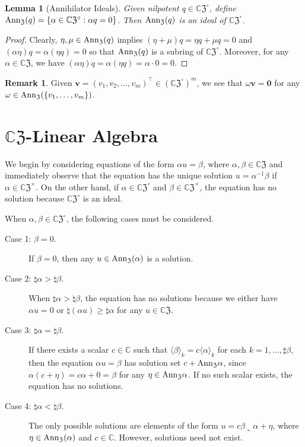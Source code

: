\documentclass{article}
\newtheorem{lemma}[theorem]{Lemma}
\theoremstyle{definition}
\newtheorem{remark}[theorem]{Remark}
\newcommand{\CZ}{\mathbb{C}\mathfrak{Z}}
\newcommand{\Z}{\mathfrak{Z}}
\newcommand{\Ann}{{\rm Ann}_\Z}
\numberwithin{equation}{section}
\begin{document}
\begin{lemma}[Annihilator Ideals]\label{annihilator ideal}
Given nilpotent $q\in\CZ^\circ$, define $\Ann(q)=\{\alpha\in\CZ^\circ: \alpha q=0\}$.  Then $\Ann(q)$ is an ideal of $\CZ^\circ$.
\end{lemma}

\begin{proof}
Clearly, $\eta, \mu\in\Ann(q)$ implies $(\eta+\mu)q=\eta q+\mu q=0$ and $(\alpha \eta)q=\alpha (\eta q)=0$ so that $\Ann(q)$ is a subring of $\CZ^\circ$.  Moreover, for any $\alpha\in\CZ$, we have $(\alpha\eta)q=\alpha(\eta q)=\alpha\cdot0=0$.
\end{proof}

\begin{remark}
Given $\mathbf{v}=(v_1, v_2, \ldots, v_m)^\intercal\in(\CZ^\circ)^m$, we see that  $\omega \mathbf{v}=\mathbf{0}$ for any $\omega\in\Ann(\{v_1, \ldots, v_m\})$.
\end{remark}


\section{$\CZ$-Linear Algebra}\label{essential zeon linear algebra}

We begin by considering equations of the form $\alpha u=\beta$, where $\alpha, \beta\in\CZ$ and immediately observe that the equation has the unique solution $u=\alpha^{-1}\beta$ if $\alpha\in\CZ^\times$.  On the other hand, if $\alpha\in\CZ^\circ$ and $\beta\in\CZ^\times$, the equation has no solution because $\CZ^\circ$ is an ideal.  

When $\alpha,\beta\in\CZ^\circ$, the following cases must be considered.  

\begin{description}
\item [Case 1: $\beta=0$.]
If $\beta=0$, then any $u\in\Ann(\alpha)$ is a solution.   

\item [Case 2: $\natural \alpha>\natural\beta$.]
When $\natural \alpha>\natural \beta$, the equation has no solutions because we either have $\alpha u=0$ or $\natural (\alpha u)\ge \natural\alpha$ for any $u\in\CZ$.  

\item [Case 3: $\natural \alpha=\natural\beta$.]
If there exists a scalar $c\in\mathbb{C}$ such that $\langle\beta\rangle_k=c\langle\alpha\rangle_k$ for each $k=1, \ldots, \sharp\beta$, then the equation $\alpha u=\beta$ has solution set $c+\Ann \alpha$, since $\alpha (c+\eta)=c\alpha+0=\beta$ for any $\eta\in\Ann\alpha$.  If no such scalar exists, the equation has no solutions.

\item [Case 4: $\natural \alpha<\natural\beta$.]  The only possible solutions are elements of the form $u=c\beta\llcorner \alpha+\eta$, where $\eta\in\Ann(\alpha)$ and $c\in\mathbb{C}$.   However, solutions need not exist.
\end{description}
\end{document}
